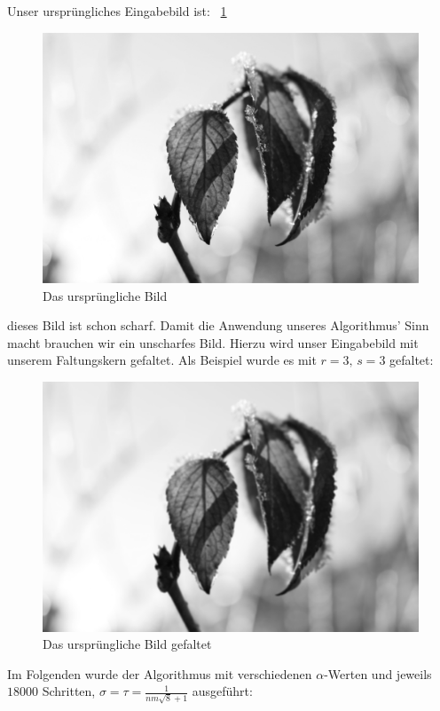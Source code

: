 \documentclass{article}
\theoremstyle{case}
\begin{document}
Unser ursprüngliches Eingabebild ist: ~\ref{fig:bild1}
\begin{figure}
  \includegraphics[width=\linewidth]{../output/input2.png}
  \caption{Das ursprüngliche Bild}
  \label{fig:bild1}
\end{figure}

dieses Bild ist schon scharf. Damit die Anwendung unseres Algorithmus' Sinn macht brauchen wir ein unscharfes Bild. Hierzu wird unser Eingabebild mit unserem Faltungskern gefaltet. Als Beispiel wurde es mit $r=3,\,s=3$ gefaltet:

\begin{figure}
  \includegraphics[width=\linewidth]{../output/input2_gefaltet2.png}
  \caption{Das ursprüngliche Bild gefaltet}
  \label{fig:bildg2}
\end{figure}

Im Folgenden wurde der Algorithmus mit verschiedenen $\alpha$-Werten und jeweils $18000$ Schritten, $\sigma=\tau=\frac{1}{nm\sqrt{8}+1}$ ausgeführt:
\end{document}
